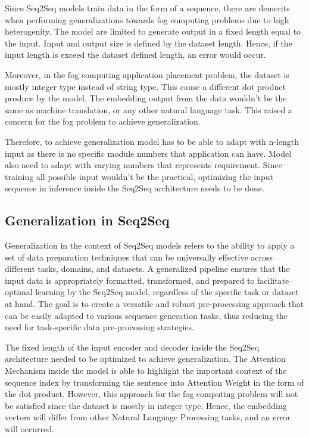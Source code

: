 \documentclass[conference]{IEEEtran}
\begin{document}
Since Seq2Seq models train data in the form of a sequence, there are demerits when performing generalizations towards fog computing problems due to high heterogenity. The model are limited to generate output in a fixed length equal to the input. Input and output size is defined by the dataset length. Hence, if the input length is exceed the dataset defined length, an error would occur. 

Moreover, in the fog computing application placement problem, the dataset is mostly integer type instead of string type. This cause a different dot product produce by the model. The embedding output from the data wouldn't be the same as machine translation, or any other natural language task. This raised a concern for the fog problem to achieve generalization.

Therefore, to achieve generalization model has to be able to adapt with n-length input as there is no specific module numbers that application can have. Model also need to adapt with varying numbers that represents requirement. Since training all possible input wouldn't be the practical, optimizing the input sequence in inference inside the Seq2Seq architecture needs to be done.

\subsection{Generalization in Seq2Seq}

Generalization in the context of Seq2Seq models refers to the ability to apply a set of data preparation techniques that can be universally effective across different tasks, domains, and datasets. A generalized pipeline ensures that the input data is appropriately formatted, transformed, and prepared to facilitate optimal learning by the Seq2Seq model, regardless of the specific task or dataset at hand. The goal is to create a versatile and robust pre-processing approach that can be easily adapted to various sequence generation tasks, thus reducing the need for task-specific data pre-processing strategies.

The fixed length of the input encoder and decoder inside the Seq2Seq architecture needed to be optimized to achieve generalization. The Attention Mechanism inside the model is able to highlight the important context of the sequence index by transforming the sentence into Attention Weight in the form of the dot product. However, this approach for the fog computing problem will not be satisfied since the dataset is mostly in integer type. Hence, the embedding vectors will differ from other Natural Language Processing tasks, and an error will occurred. 
\end{document}
